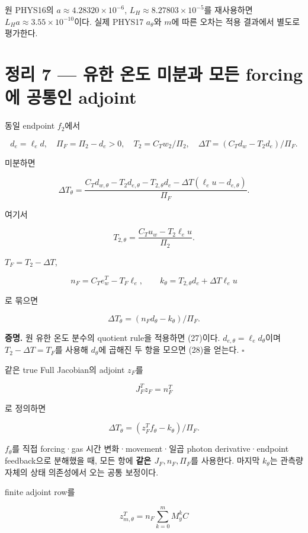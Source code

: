 원 PHYS16의 \(a\approx4.28320\times10^{-6}\), \(L_H\approx8.27803\times10^{-5}\)를 재사용하면 \(L_Ha\approx3.55\times10^{-10}\)이다. 실제 PHYS17 \(a_\theta\)와 \(m\)에 따른 오차는 적용 결과에서 별도로 평가한다.

\hypertarget{uxc815uxb9ac-7-uxc720uxd55c-uxc628uxb3c4-uxbbf8uxbd84uxacfc-uxbaa8uxb4e0-forcinguxc5d0-uxacf5uxd1b5uxc778-adjoint}{%
\section{정리 7 --- 유한 온도 미분과 모든 forcing에 공통인 adjoint}\label{uxc815uxb9ac-7-uxc720uxd55c-uxc628uxb3c4-uxbbf8uxbd84uxacfc-uxbaa8uxb4e0-forcinguxc5d0-uxacf5uxd1b5uxc778-adjoint}}

동일 endpoint \(f_2\)에서

\[
d_e=\ell_ed,\quad \Pi_F=\Pi_2-d_e>0,\quad
T_2=C_Tw_2/\Pi_2,\quad
\Delta T=(C_Td_w-T_2d_e)/\Pi_F.
\]

미분하면

\[
\boxed{\Delta T_\theta=
\frac{C_Td_{w,\theta}-T_2d_{e,\theta}
-T_{2,\theta}d_e-\Delta T(\ell_eu-d_{e,\theta})}{\Pi_F}.}
\tag{27}
\]

여기서

\[
T_{2,\theta}=\frac{C_Tu_w-T_2\ell_eu}{\Pi_2}.
\]

\(T_F=T_2-\Delta T\),

\[
n_F=C_Te_w^T-T_F\ell_e,\qquad
k_\theta=T_{2,\theta}d_e+\Delta T\ell_eu
\]

로 묶으면

\[
\boxed{\Delta T_\theta=(n_Fd_\theta-k_\theta)/\Pi_F.}
\tag{28}
\]

\textbf{증명.} 원 유한 온도 분수의 quotient rule을 적용하면 (27)이다. \(d_{e,\theta}=\ell_ed_\theta\)이며 \(T_2-\Delta T=T_F\)를 사용해 \(d_\theta\)에 곱해진 두 항을 모으면 (28)을 얻는다. \(\square\)

같은 true Full Jacobian의 adjoint \(z_F\)를

\[
J_F^Tz_F=n_F^T
\]

로 정의하면

\[
\boxed{\Delta T_\theta=(z_F^Tf_\theta-k_\theta)/\Pi_F.}
\tag{29}
\]

\(f_\theta\)를 직접 forcing·gas 시간 변화·movement·일곱 photon derivative·endpoint feedback으로 분해했을 때, 모든 항에 \textbf{같은 \(J_F,n_F,\Pi_F\)}를 사용한다. 마지막 \(k_\theta\)는 관측량 자체의 상태 의존성에서 오는 공통 보정이다.

finite adjoint row를

\[
z_{m,\theta}^T=n_F\sum_{k=0}^mM_y^kC
\]

